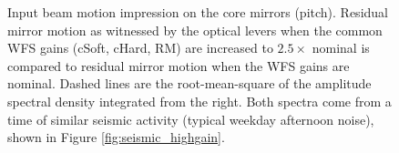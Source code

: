 \begin{figure}
\begin{centering}
\caption[Impression of input beam motion on the core mirrors]{Input
  beam motion impression on the core mirrors (pitch). Residual mirror
  motion as witnessed by the optical levers when the common WFS gains
  (cSoft, cHard, RM) are increased to $2.5\times$ nominal is compared
  to residual mirror motion when the WFS gains are nominal. Dashed
  lines are the root-mean-square of the amplitude spectral density
  integrated from the right. Both spectra come from a time of similar
  seismic activity (typical weekday afternoon noise), shown in
  Figure \ref{fig:seismic_highgain}.}
\label{fig:inputbeam_impression}
\end{centering}
\end{figure}

\begin{figure}
\begin{centering}

\end{centering}
\end{figure}
